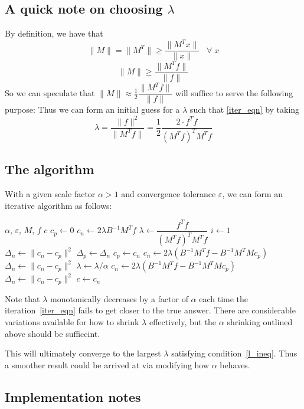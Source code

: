\documentclass[12pt,a4paper]{article}
\newcommand{\eps}{\varepsilon}
\begin{document}
\subsection{A quick note on choosing $\lambda$}
By definition, we have that
\[
    \| M \| = \| M^T \| \ge \dfrac{\|M^Tx\|}{\|x\|} \;\;\; \forall \; x 
\]
\[
    \| M \| \ge \dfrac{\|M^Tf\|}{\|f\|}
\]
So we can speculate that $\|M\| \approx \frac{1}{2} \dfrac{\|M^Tf\|}{\|f\|}$ will
suffice to serve the following purpose: 
Thus we can form an initial guess for a $\lambda$ such that \ref{iter_eqn} by
taking
\[
    \lambda = \dfrac{\|f\|^2}{\|M^T f\|} = \dfrac{1}{2} \dfrac{2 \cdot f^T f}{(M^T f)^T M^T f}
\]

\subsection{The algorithm}
With a given scale factor $\alpha > 1$ and convergence tolerance $\eps$,
we can form an iterative algorithm as follows:
\begin{algorithmic}
    \Require $\alpha$, $\eps$, $M$, $f$ 
    \Ensure $c$
    \State $c_p \gets 0$
    \State $c_n \gets 2 \lambda B^{-1} M^T f$
    \State $\lambda \gets \dfrac{f^T f}{(M^T f)^T M^T f}$
    \State $i \gets 1$
    \State $\Delta_n \gets \|c_n - c_p\|^2$
    \While{$\Delta_n \ge \eps$}
        \State $\Delta_p \gets \Delta_n$
        \State $c_p \gets c_n$
        \State $c_n \gets 2\lambda \left( B^{-1} M^T f - B^{-1} M^T M c_p\right)$
        \State $\Delta_n \gets \|c_n - c_p\|^2$
            \State $\lambda \gets \lambda / \alpha$
            \State $c_n \gets 2\lambda \left( B^{-1} M^T f - B^{-1} M^T M c_p\right)$
            \State $\Delta_n \gets \|c_n - c_p\|^2$
        \EndWhile
    \EndWhile
    \State $c \gets c_n$
\end{algorithmic}
Note that $\lambda$ monotonically decreases by a factor of $\alpha$ each time
the iteration~\ref{iter_eqn} fails to get closer to the true answer.
There are considerable variations available for how to shrink $\lambda$ effectively,
but the $\alpha$ shrinking outlined above should be sufficeint.

This will ultimately converge to the largest $\lambda$ satisfying condition~\ref{l_ineq}.
Thus a smoother result could be arrived at via modifying how $\alpha$ behaves.

\subsection{Implementation notes}
\end{document}
